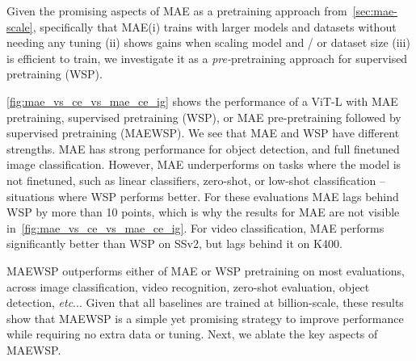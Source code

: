 \documentclass[10pt,twocolumn,letterpaper]{article}
\makeatletter
\DeclareRobustCommand\onedot{\futurelet\@let@token\@onedot}
\def\@onedot{\ifx\@let@token.\else.\null\fi\xspace}
\def\etc{\emph{etc}\onedot} \def\vs{\emph{vs}\onedot}
\newcommand{\prept}{pre-pretraining\xspace}
\newcommand{\preptemph}{\emph{pre-}pretraining\xspace}
\newcommand{\mae}{MAE\xspace}
\newcommand{\ce}{WSP\xspace}
\newcommand{\ours}{MAEWSP\xspace}  \newcommand{\oursig}{\ours{}\textsubscript{IG}\xspace}
\newcommand{\vitL}{ViT-L\xspace}
\newcommand{\kineticsShort}{K400\xspace}
\newcommand{\sthsthShort}{SSv2\xspace}
\makeatother
\begin{document}
Given the promising aspects of \mae as a pretraining approach from~\cref{sec:mae-scale}, specifically that \mae (i) trains with larger models and datasets
without needing any tuning (ii) shows gains when scaling model and / or dataset size (iii) is efficient to train, we investigate it
as a \preptemph approach for supervised pretraining (\ce).

\cref{fig:mae_vs_ce_vs_mae_ce_ig} shows the performance of a \vitL with \mae pretraining, supervised pretraining (\ce), or
\mae \prept followed by supervised pretraining (\ours). We see that \mae and \ce have different strengths. \mae has strong performance for object detection, and full finetuned image classification. However, \mae underperforms on tasks where the model
is not finetuned, such as linear
classifiers, zero-shot, or low-shot classification -- situations where \ce performs better. For
these evaluations \mae lags behind \ce by more than 10 points, which is why the results for \mae are not visible in~\cref{fig:mae_vs_ce_vs_mae_ce_ig}.
For video classification, \mae performs significantly better than \ce on \sthsthShort, but lags behind it on \kineticsShort.

\ours outperforms either of \mae or \ce pretraining on most evaluations, across image classification, video recognition, zero-shot evaluation, object detection, \etc.
Given that all baselines are trained at billion-scale, these results show that \ours is a simple yet promising strategy to improve performance while requiring no extra data or tuning.
Next, we ablate the key aspects of \ours.
\end{document}
